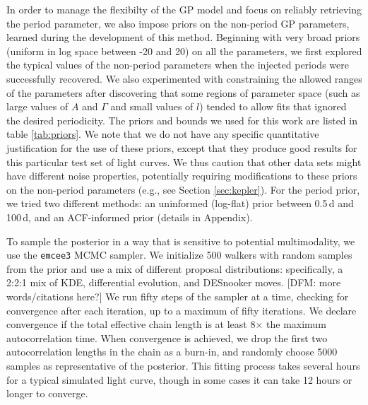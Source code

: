 \documentclass[useAMS, usenatbib, preprint, 12pt]{aastex}
\begin{document}
In order to manage the flexibilty of the GP model and focus on reliably
retrieving the period parameter, we also impose priors on the non-period GP
parameters, learned during the development of this method.
Beginning with very broad priors (uniform in log space between -20 and 20) on
all the parameters, we first explored the typical values of the non-period
parameters when the injected periods were successfully recovered.
We also experimented with constraining the allowed ranges of the parameters
after discovering that some regions of parameter space (such as large values
of $A$ and $\Gamma$ and small values of $l$) tended to allow fits that ignored
the desired periodicity.
The priors and bounds we used for this work are listed in table
\ref{tab:priors}.
We note that we do not have any specific quantitative justification for the
use of these priors, except that they produce good results for this particular
test set of light curves.
We thus caution that other data sets might have different noise properties,
potentially requiring modifications to these priors on the non-period
parameters (e.g., see Section \ref{sec:kepler}).
For the period prior, we tried two different methods: an uninformed (log-flat)
prior between 0.5\,d and 100\,d, and an ACF-informed prior (details in
Appendix).

To sample the posterior in a way that is sensitive to potential multimodality,
we use the \texttt{emcee3} MCMC sampler.
We initialize 500 walkers with random samples from the prior and use a mix of
different proposal distributions: specifically, a 2:2:1 mix of KDE,
differential evolution, and DESnooker moves.
[DFM: more words/citations here?]
We run fifty steps of the sampler at a time, checking for convergence after
each iteration, up to a maximum of fifty iterations.
We declare convergence if the total effective chain length is at least
8$\times$ the maximum autocorrelation time.
When convergence is achieved, we drop the first two autocorrelation lengths in
the chain as a burn-in, and randomly choose 5000 samples as representative of
the posterior.
This fitting process takes several hours for a typical simulated light curve,
though in some cases it can take 12 hours or longer to converge.
\end{document}
